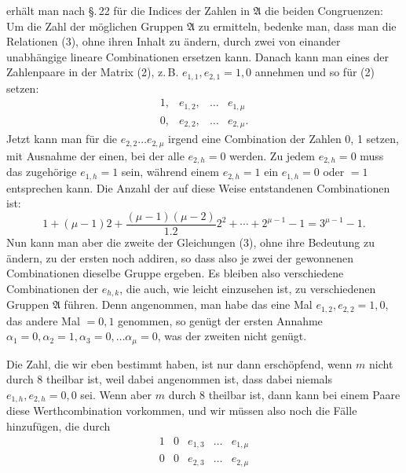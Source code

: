 erhält man nach \S.\,22 für die Indices der Zahlen in $\mathfrak{A}$ die beiden Congruenzen:
Um die Zahl der möglichen Gruppen $\mathfrak{A}$ zu ermitteln, bedenke man, dass man die Relationen (3), ohne ihren Inhalt zu ändern, durch zwei von einander unabhängige lineare Combinationen ersetzen kann. Danach kann man eines der Zahlenpaare in der Matrix (2), z.\,B. $e_{1,1}, e_{2,1} = 1, 0$ annehmen und so für (2) setzen:
\[
\begin{array}{cccc}
1, & e_{1,2}, & \ldots & e_{1,\mu}\\
0, & e_{2,2}, & \ldots & e_{2,\mu}.
\end{array}
\]
Jetzt kann man für die $e_{2,2} \ldots e_{2,\mu}$ irgend eine Combination der Zahlen 0, 1 setzen, mit Ausnahme der einen, bei der alle $e_{2,h} = 0$ werden. Zu jedem $e_{2,h} = 0$ muss das zugehörige $e_{1,h} = 1$ sein, während einem $e_{2,h} = 1$ ein $e_{1,h} = 0$ oder $= 1$ entsprechen kann. Die Anzahl der auf diese Weise entstandenen Combinationen ist:
\[
1 + (\mu - 1)2 + \frac{(\mu - 1)(\mu - 2)}{1.2} 2^2 + \cdots + 2^{\mu - 1} - 1 = 3^{\mu - 1} - 1.
\]
Nun kann man aber die zweite der Gleichungen (3), ohne ihre Bedeutung zu ändern, zu der ersten noch addiren, so dass also je zwei der gewonnenen Combinationen dieselbe Gruppe ergeben. Es bleiben also
verschiedene Combinationen der $e_{h,k}$, die auch, wie leicht einzusehen ist, zu verschiedenen Gruppen $\mathfrak{A}$ führen. Denn angenommen, man habe das eine Mal $e_{1,2}, e_{2,2} = 1, 0$, das andere Mal $= 0, 1$ genommen, so genügt der ersten Annahme $\alpha_1 = 0, \alpha_2 = 1, \alpha_3 = 0, \ldots \alpha_\mu = 0$, was der zweiten nicht genügt. %

Die Zahl, die wir eben bestimmt haben, ist nur dann erschöpfend, wenn $m$ nicht durch 8 theilbar ist, weil dabei angenommen ist, dass dabei niemals $e_{1,h}, e_{2,h} = 0, 0$ sei. Wenn aber $m$ durch 8 theilbar ist, dann kann bei einem Paare diese Werthcombination vorkommen, und wir müssen also noch die Fälle hinzufügen, die durch
\[
\begin{array}{ccccc}
1 & 0 & e_{1,3} & \ldots & e_{1,\mu}\\
0 & 0 & e_{2,3} & \ldots & e_{2,\mu}
\end{array}
\]
